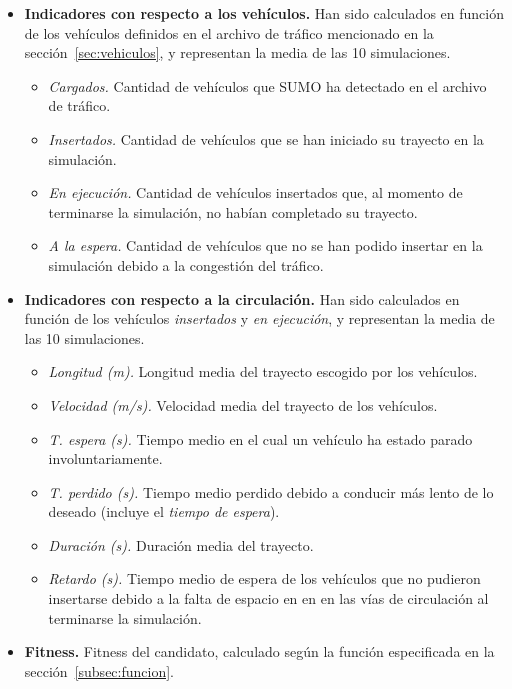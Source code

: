 \begin{itemize}
    \item \textbf{Indicadores con respecto a los vehículos.} Han sido calculados en función de los vehículos definidos en el archivo de tráfico mencionado en la sección~\ref{sec:vehiculos}, y representan la media de las 10 simulaciones.
    \begin{itemize}
        \item \textit{Cargados.} Cantidad de vehículos que SUMO ha detectado en el archivo de tráfico.
        \item \textit{Insertados.} Cantidad de vehículos que se han iniciado su trayecto en la simulación.
        \item \textit{En ejecución.} Cantidad de vehículos insertados que, al momento de terminarse la simulación, no habían completado su trayecto.
        \item \textit{A la espera.} Cantidad de vehículos que no se han podido insertar en la simulación debido a la congestión del tráfico.
    \end{itemize}
    
    \item \textbf{Indicadores con respecto a la circulación.} Han sido calculados en función de los vehículos \textit{insertados} y \textit{en ejecución}, y representan la media de las 10 simulaciones.
    \begin{itemize}
        \item \textit{Longitud (m).} Longitud media del trayecto escogido por los vehículos.
        \item \textit{Velocidad (m/s).} Velocidad media del trayecto de los vehículos.
        \item \textit{T. espera (s).} Tiempo medio en el cual un vehículo ha estado parado involuntariamente.
        \item \textit{T. perdido (s).} Tiempo medio perdido debido a conducir más lento de lo deseado (incluye el \textit{tiempo de espera}).
        \item \textit{Duración (s).} Duración media del trayecto.
        \item \textit{Retardo (s).} Tiempo medio de espera de los vehículos que no pudieron insertarse debido a la falta de espacio en en en las vías de circulación al terminarse la simulación.
    \end{itemize}
    
    \item \textbf{Fitness.} Fitness del candidato, calculado según la función especificada en la sección~\ref{subsec:funcion}.
\end{itemize}

